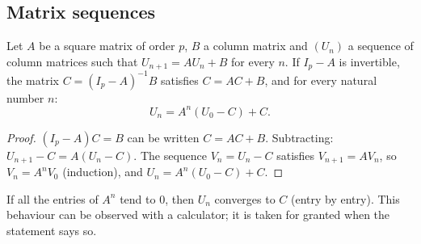 \subsection{Matrix sequences}
\begin{theorem}[Sequence $U_{n+1}=AU_n+B$]
Let $A$ be a square matrix of order $p$, $B$ a column matrix and $(U_n)$ a sequence of column matrices such that $U_{n+1}=AU_n+B$ for every $n$. If $I_p-A$ is invertible, the matrix $C=(I_p-A)^{-1}B$ satisfies $C=AC+B$, and for every natural number $n$:
\[U_n=A^n\left(U_0-C\right)+C.\]
\end{theorem}
\begin{proof}
$(I_p-A)C=B$ can be written $C=AC+B$. Subtracting: $U_{n+1}-C=A(U_n-C)$. The sequence $V_n=U_n-C$ satisfies $V_{n+1}=AV_n$, so $V_n=A^nV_0$ (induction), and $U_n=A^n(U_0-C)+C$.
\end{proof}
\begin{keypoint}
If all the entries of $A^n$ tend to $0$, then $U_n$ converges to $C$ (entry by entry). This behaviour can be observed with a calculator; it is taken for granted when the statement says so.
\end{keypoint}

